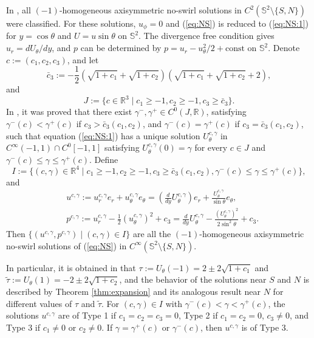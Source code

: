 \documentclass[12pt]{article}
\newcommand{\bS}{\mathbb{S}}
\begin{document}
In \cite{LLY2}, all $(-1)$-homogeneous axisymmetric no-swirl solutions in $C^2(\mathbb{S}^2 \setminus \{ S, N\})$ were classified. For these solutions, $u_{\phi}=0$ and (\ref{eq:NS}) is reduced to (\ref{eq:NS:1}) for $y=\cos\theta$ and $U=u\sin\theta$ on $\bS^2$. The divergence free condition gives $u_{r} =dU_{\theta}/dy$, and $p$ can be determined by $p=u_r-u_{\theta}^2/2 + \text{const}$ on $\bS^2$. Denote $c := (c_1,c_2,c_3)$, and let
\[
	\bar{c}_3 := - \frac{1}{2} \left( \sqrt{1+c_1} + \sqrt{1+c_2} \right) \left( \sqrt{1+c_1} + \sqrt{1+c_2} + 2\right),
\] and 
\begin{equation}\label{eq:J}
	J:=\{c\in\mathbb{R}^3\mid c_1\ge -1, c_2\ge -1, c_3\ge \bar{c}_3\}.
\end{equation}
In \cite{LLY2}, it was proved that there exist $\gamma^-,\gamma^+\in C^0(J, \mathbb{R})$, satisfying $\gamma^-(c)<\gamma^+(c)$ if $c_3>\bar{c}_3(c_1,c_2)$, and $\gamma^-(c)=\gamma^+(c)$ if $c_3=\bar{c}_3(c_1,c_2)$, such that equation (\ref{eq:NS:1}) has a unique solution $U_{\theta}^{c,\gamma}$ in $C^{\infty}(-1,1)\cap C^0[-1,1]$ satisfying $U_{\theta}^{c,\gamma}(0)=\gamma$ for every $c \in J$ and $\gamma^-(c)\le \gamma \le \gamma^+(c)$. Define
\begin{equation*}
	I:= \{(c, \gamma)\in \mathbb{R}^4 \mid c_1\geq -1, c_2\geq -1, c_3\geq \bar{c}_3(c_1,c_2), \gamma^-(c)\leq \gamma \leq \gamma^+(c) \}, 
\end{equation*}
and
\begin{equation}
\begin{split}
	& u^{c,\gamma}:= u^{c,\gamma}_re_r+u^{c,\gamma}_{\theta}e_{\theta}=(\frac{d}{dy}U^{c,\gamma}_{\theta})e_r+\frac{U^{c,\gamma}_{\theta}}{\sin\theta}e_{\theta}, \\
	& p^{c,\gamma}:=u^{c,\gamma}_r-\frac{1}{2}(u^{c,\gamma}_{\theta})^2 + c_3 = \frac{d}{dy}U^{c,\gamma}_{\theta}-\frac{(U^{c,\gamma}_{\theta})^2}{2\sin^2\theta} + c_3.
\end{split}
\end{equation}
Then $\{(u^{c,\gamma}, p^{c,\gamma})\mid (c, \gamma)\in I\}$ are all the $(-1)$-homogeneous axisymmetric no-swirl solutions of (\ref{eq:NS}) in $C^{\infty}(\bS^2\setminus\{S, N\})$. 

In particular, it is obtained in \cite{LLY2} that $\tau:=U_{\theta}(-1)=2\pm 2\sqrt{1+c_1}$ and $\tilde{\tau}:=U_{\theta}(1)=-2\pm 2\sqrt{1+c_2}$, and the behavior of the solutions near $S$ and $N$ is described by Theorem \ref{thm:expansion} and its analogous result near $N$ for different values of $\tau$ and $\tilde{\tau}$. For $(c, \gamma)\in I$ with $\gamma^{-}(c)<\gamma<\gamma^{+}(c)$, the solutions $u^{c,\gamma}$ are of Type 1 if $c_1=c_2=c_3=0$, Type 2 if $c_1=c_2=0$, $c_3\ne 0$, and Type 3 if $c_1\ne 0$ or $c_2\ne 0$. If $\gamma=\gamma^{+}(c)$ or $\gamma^{-}(c)$, then $u^{c, \gamma}$ is of Type 3. 
\end{document}
